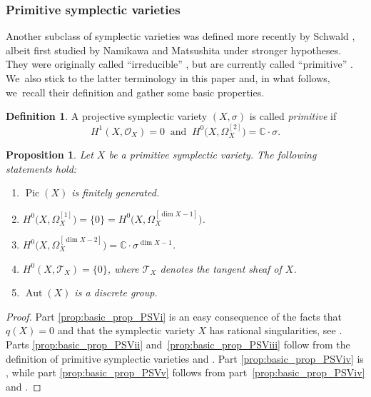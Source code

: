 \documentclass[10pt]{amsart}
\theoremstyle{plain}
\newtheorem{prop}[thm]{Proposition}
\theoremstyle{definition}
\newtheorem{dfn}[thm]{Definition}
\newcommand{\C}{\mathbb{C}}
\newcommand{\OO}{\mathcal{O}}
\DeclareMathOperator{\Aut}{Aut}
\DeclareMathOperator{\Pic}{Pic}
\begin{document}
\subsubsection{Primitive symplectic varieties}

Another subclass of symplectic varieties was defined more recently by Schwald \cite{Schwald20}, albeit first studied by Namikawa and Matsushita under stronger hypotheses. They were originally called \enquote{irreducible} \cite{Schwald20}, but are currently called \enquote{primitive} \cite{BL22}. We~also stick to the latter terminology in this paper and, in what follows, we~recall their definition and gather some basic properties.

\begin{dfn}
\label{dfn:PSV}
A projective symplectic variety $(X,\sigma)$ is called \emph{primitive} if
\[
H^1(X,\OO_X) = 0 \ \text{ and } \ H^0 \bigl(X, \Omega_X^{[2]} \bigr) = \C \cdot \sigma.
\]
\end{dfn}

\begin{prop}
\label{prop:basic_prop_PSV}
Let $X$ be a primitive symplectic variety. The following statements hold:
\begin{enumerate}
\itemsep 2pt

\item\label{prop:basic_prop_PSVi}
$\Pic(X)$ is finitely generated.

\item\label{prop:basic_prop_PSVii}
$H^0 \bigl(X,\Omega_X^{[1]} \bigr) = \{ 0 \} = H^0 \bigl(X,\Omega_X^{[\dim X - 1]} \bigr)$.

\item\label{prop:basic_prop_PSViii}
$H^0 \bigl(X,\Omega_X^{[\dim X - 2]} \bigr) = \C \cdot \sigma^{\dim X -1}$.

\item\label{prop:basic_prop_PSViv}
$H^0(X,\mathscr{T}_X) = \{ 0 \}$, where $\mathscr{T}_X$ denotes the tangent sheaf of $X$.

\item\label{prop:basic_prop_PSVv}
$\Aut(X)$ is a discrete group.
\end{enumerate}
\end{prop}

\begin{proof}
Part \eqref{prop:basic_prop_PSVi} is an easy consequence of the facts that $q(X) = 0$ and that the symplectic variety $X$ has rational singularities, see \cite[Prop.\,1.3]{Beauville00a}. Parts \eqref{prop:basic_prop_PSVii} and~\eqref{prop:basic_prop_PSViii} follow from the definition of primitive symplectic varieties and \cite[Prop.\,6.9 \& Cor.\,6.10]{GKP16b}. Part \eqref{prop:basic_prop_PSViv} is \cite[Lem.\,4.6]{BL22}, while part \eqref{prop:basic_prop_PSVv} follows from part~\eqref{prop:basic_prop_PSViv} and \cite[Lem.\,3.4]{MO67}.
\end{proof}
\end{document}
